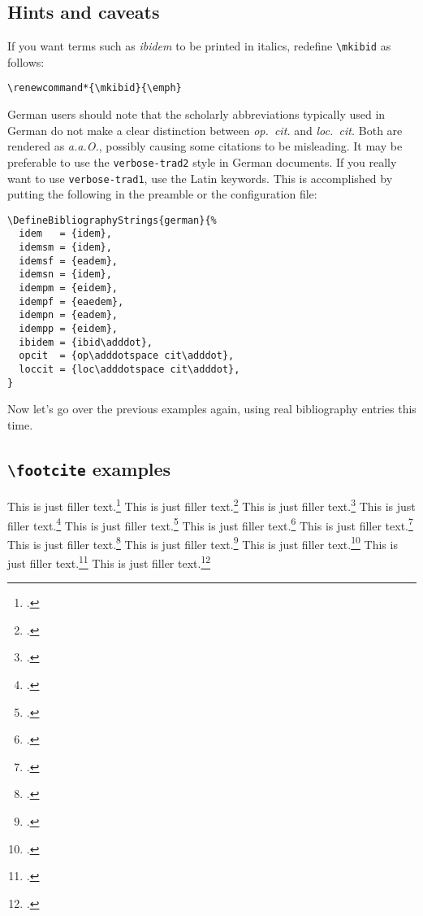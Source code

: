 \documentclass[a4paper]{article}
\newcommand*{\cmd}[1]{\texttt{\textbackslash #1}}
\begin{document}
\subsection*{Hints and caveats}

If you want terms such as \emph{ibidem} to be printed in italics,
redefine \cmd{mkibid} as follows:

\begin{verbatim}
\renewcommand*{\mkibid}{\emph}
\end{verbatim}
%
German users should note that the scholarly abbreviations typically
used in German do not make a clear distinction between
\emph{op.~cit.} and \emph{loc.~cit.} Both are rendered as
\emph{a.a.O.}, possibly causing some citations to be misleading. It
may be preferable to use the \texttt{verbose-trad2} style in German
documents. If you really want to use \texttt{verbose-trad1}, use the
Latin keywords. This is accomplished by putting the following in the
preamble or the configuration file:

\begin{verbatim}
\DefineBibliographyStrings{german}{%
  idem   = {idem},
  idemsm = {idem},
  idemsf = {eadem},
  idemsn = {idem},
  idempm = {eidem},
  idempf = {eaedem},
  idempn = {eadem},
  idempp = {eidem},
  ibidem = {ibid\adddot},
  opcit  = {op\adddotspace cit\adddot},
  loccit = {loc\adddotspace cit\adddot},
}
\end{verbatim}
%
Now let's go over the previous examples again, using real
bibliography entries this time.

\clearpage

\subsection*{\cmd{footcite} examples}

This is just filler text.\footcite{aristotle:anima}
This is just filler text.\footcite{averroes/bland}
This is just filler text.\footcite[26]{aristotle:anima}
This is just filler text.\footcite[59--61]{averroes/bland}
This is just filler text.\footcite[26]{aristotle:anima}
This is just filler text.\footcite[59--61]{averroes/bland}
This is just filler text.\footcite{aristotle:physics}
This is just filler text.\footcite{averroes/bland}
This is just filler text.\footcite{aristotle:anima}
This is just filler text.\footcite[55]{aristotle:physics}
This is just filler text.\footcite[25]{aristotle:physics}
This is just filler text.\footcite[25]{aristotle:physics}
\end{document}
